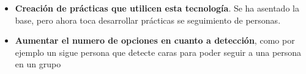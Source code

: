 \begin{itemize}
  \item \textbf{Creación de prácticas que utilicen esta tecnología}. Se ha asentado la base, pero ahora toca desarrollar prácticas se seguimiento de personas.
  \item \textbf{Aumentar el numero de opciones en cuanto a detección}, como por ejemplo un sigue persona que detecte caras para poder seguir a una persona en un grupo
\end{itemize}
